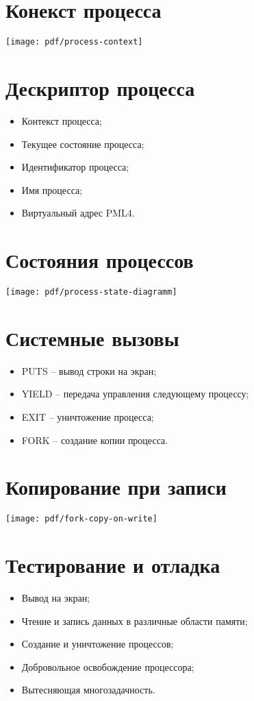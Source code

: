 \documentclass[12pt]{article}
\begin{document}
\section{\textbf{Конекст процесса}}
\begin{center}
\texttt{[image: pdf/process-context]}
\end{center}


\section{\textbf{Дескриптор процесса}}
\begin{itemize}
\item Контекст процесса;
\item Текущее состояние процесса;
\item Идентификатор процесса;
\item Имя процесса;
\item Виртуальный адрес PML4.
\end{itemize}


\section{\textbf{Состояния процессов}}
\begin{center}
\texttt{[image: pdf/process-state-diagramm]}
\end{center}


\section{\textbf{Системные вызовы}}
\begin{itemize}
\item PUTS -- вывод строки на экран;
\item YIELD -- передача управления следующему процессу;
\item EXIT -- уничтожение процесса;
\item FORK -- создание копии процесса.
\end{itemize}


\section{\textbf{Копирование при записи}}
\texttt{[image: pdf/fork-copy-on-write]}


\section{\textbf{Тестирование и отладка}}
\begin{itemize}
\item Вывод на экран;
\item Чтение и запись данных в различные области памяти;
\item Создание и уничтожение процессов;
\item Добровольное освобождение процессора;
\item Вытесняющая многозадачность.
\end{itemize}
\end{document}
